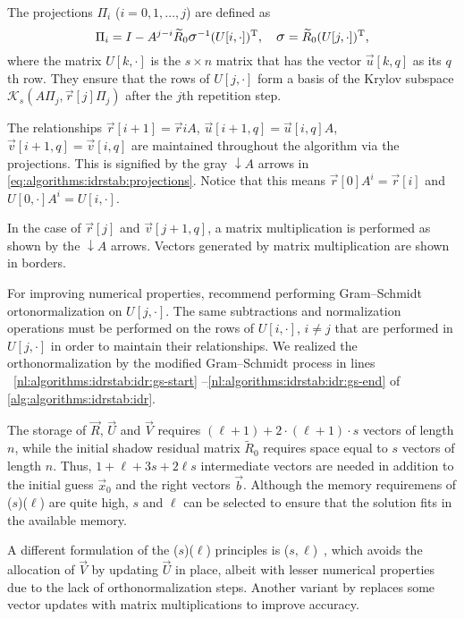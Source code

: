 The projections $\Pi_i$ ($i = 0, 1, \ldots, j$) are defined as
\begin{equation}
  \Pi_i = I - A^{j - i} \widetilde{R}_0 \largesigma^{-1} (U[i, \cdot])^\T,
  \quad \largesigma = \widetilde{R}_0 (U[j, \cdot])^\T \text,
\end{equation}
where the matrix $U[k, \cdot]$ is the $s \times n$ matrix that has the
vector $\vec{u}[k, q]$ as its $q$th row. They ensure that the rows of
$U[j, \cdot]$ form a basis of the Krylov subspace
$\mathcal{K}_s(A \Pi_j, \vec{r}[j] \Pi_j)$ after the $j$th repetition
step.

The relationships $\vec{r}[i + 1] = \vec{r}{i} A$,
$\vec{u}[i + 1, q] = \vec{u}[i, q] A$,
$\vec{v}[i + 1, q] = \vec{v}[i, q]$ are maintained throughout the
algorithm via the projections. This is signified by the gray
{\color{black!50}$\downarrow A$} arrows in
\cref{eq:algorithms:idrstab:projections}. Notice that this means
$\vec{r}[0] A^i = \vec{r}[i]$ and $U[0, \cdot] A^i = U[i, \cdot]$.

In the case of $\vec{r}[j]$ and $\vec{v}[j + 1, q]$, a matrix
multiplication is performed as shown by the $\downarrow A$
arrows. Vectors generated by matrix multiplication are shown in
borders.

For improving numerical properties, \citet{sleijpen2010exploiting}
recommend performing Gram--Schmidt ortonormalization on $U[j, \cdot]$.
The same subtractions and normalization operations must be performed
on the rows of $U[i, \cdot]$, $i \ne j$ that are performed in
$U[j, \cdot]$ in order to maintain their relationships. We realized
the orthonormalization by the modified Gram--Schmidt process in lines%
~\ref{nl:algorithms:idrstab:idr:gs-start}%
--\ref{nl:algorithms:idrstab:idr:gs-end} of
\cref{alg:algorithms:idrstab:idr}.

The storage of $\vec{R}$, $\vec{U}$ and $\vec{V}$ requires
$(\ell + 1) + 2 \cdot (\ell + 1) \cdot s$ vectors of length $n$, while
the initial shadow residual matrix $\widetilde{R}_0$ requires space
equal to $s$ vectors of length $n$. Thus, $1 + \ell + 3s + 2\ell s$
intermediate vectors are needed in addition to the initial guess
$\vec{x}_0$ and the right vectors $\vec{b}$. Although the memory
requiremens of ($s$)($\ell$) are quite high,
$s$ and $\ell$ can be selected to ensure that the solution fits in the
available memory.

A different formulation of the ($s$)($\ell$)
principles is ($s, \ell$)~\citep{tanio2010gbi},
which avoids the allocation of $\vec{V}$ by updating $\vec{U}$ in
place, albeit with lesser numerical properties due to the lack of
orthonormalization steps. Another variant by
\textcite{aihara2014variant} replaces some vector updates with matrix
multiplications to improve accuracy.

